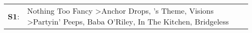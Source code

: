 \begin{supertabular}{p{0.03\textwidth}p{0.92\textwidth}}
 \textbf{S1}:  &  Nothing Too Fancy\textsuperscript{} \textgreater \enspace Anchor Drops\textsuperscript{}, 's Theme\textsuperscript{}, \enspace Visions\textsuperscript{} \textgreater \enspace Partyin' Peeps\textsuperscript{}, \enspace Baba O'Riley\textsuperscript{}, \enspace In The Kitchen\textsuperscript{}, \enspace Bridgeless\textsuperscript{}  \enspace  \\
\end{supertabular}
